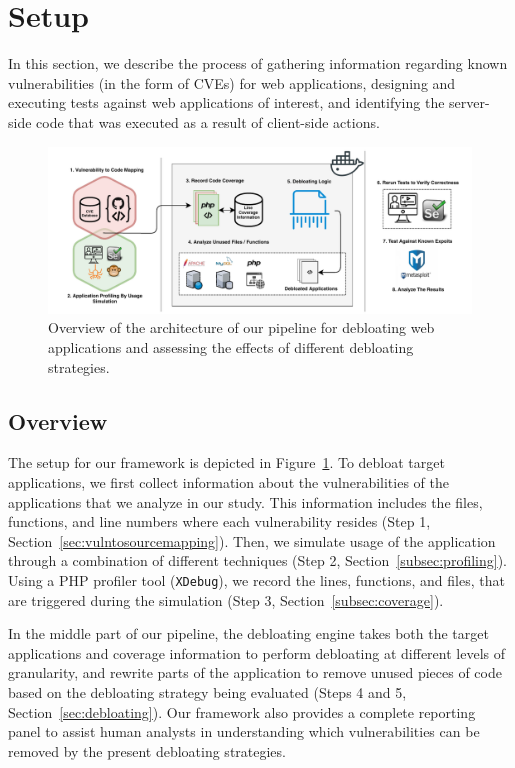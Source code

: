 \section{Setup}
In this section, we describe the process of gathering information regarding
known vulnerabilities (in the form of CVEs) for web applications, designing
and executing tests against web applications of interest, and identifying
the server-side code that was executed as a result of client-side actions.


\begin{figure}[t]
  \includegraphics[width=\linewidth]{figures/DebloatingPipeline.pdf}
  \caption{Overview of the architecture of our pipeline for debloating web applications and assessing the effects of different debloating strategies.}
  \label{fig:debloatingpipeline}
\end{figure}

\subsection{Overview}
The setup for our framework is depicted in
Figure~\ref{fig:debloatingpipeline}. To debloat target applications, we first
collect information about the vulnerabilities of the applications that we
analyze in our study. This information includes the files, functions, and
line numbers where each
vulnerability resides (Step 1, Section~\ref{sec:vulntosourcemapping}). Then,
we simulate usage of the application through a combination of different
techniques (Step 2, Section~\ref{subsec:profiling}). Using a PHP profiler
tool (\texttt{XDebug}), we record the lines, functions, and files, that are
triggered during the simulation (Step 3, Section~\ref{subsec:coverage}).

In the middle part of our pipeline, the debloating engine takes both the
target applications and coverage information to perform debloating at
different levels of granularity, and rewrite parts of the application to
remove unused pieces of code based on the debloating strategy being evaluated
(Steps 4 and 5, Section~\ref{sec:debloating}). Our framework also provides
a complete reporting panel to assist human analysts in understanding which
vulnerabilities can be removed by the present debloating strategies.

